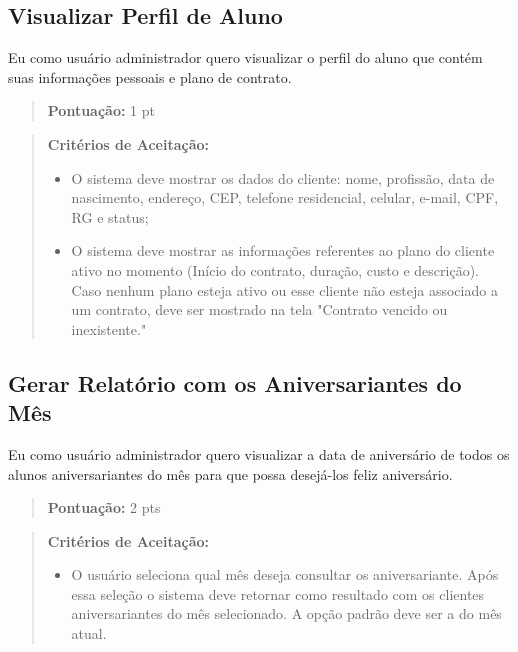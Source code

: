 \subsection[Visualizar Perfil de Aluno]{Visualizar Perfil de Aluno}
Eu como usuário administrador quero visualizar o perfil do aluno que contém suas
informações pessoais e plano de contrato.
\begin{quote}
    \textbf{Pontuação:} 1 pt
\end{quote}
\begin{quote}
\textbf{Critérios de Aceitação:}
    \begin{itemize}
        \item O sistema deve mostrar os dados do cliente: nome, profissão, data de nascimento, endereço, CEP, telefone residencial, celular, e-mail, CPF, RG e status;
        \item O sistema deve mostrar as informações referentes ao plano do cliente ativo no momento (Início do contrato, duração,  custo e descrição). Caso nenhum plano esteja ativo ou esse cliente não esteja associado a um contrato, deve ser mostrado na tela "Contrato vencido ou inexistente."
    \end{itemize}
\end{quote}

\subsection[Gerar Relatório com os Aniversariantes do Mês]{Gerar Relatório com os Aniversariantes do Mês}
Eu como usuário administrador quero visualizar a data de aniversário de todos os
alunos aniversariantes do mês para que possa desejá-los feliz aniversário.
\begin{quote}
    \textbf{Pontuação:} 2 pts
\end{quote}
\begin{quote}
\textbf{Critérios de Aceitação:}
    \begin{itemize}
        \item O usuário seleciona qual mês deseja consultar os aniversariante. Após essa seleção o sistema deve retornar como resultado com os clientes aniversariantes do mês selecionado. A opção padrão deve ser a do mês atual.
    \end{itemize}
\end{quote}

